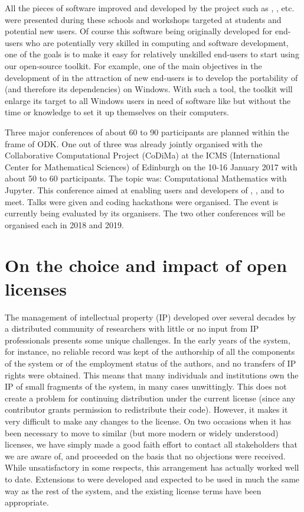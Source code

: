 \documentclass{deliverablereport}
\begin{document}
All the pieces of software improved and developed by the project such as \Sage, \Singular, etc. were presented during these schools and workshops targeted at students and potential new users. Of course this software being originally developed for end-users who are potentially very skilled in computing and software development, one of the goals is to make it easy  for relatively unskilled end-users to start using our open-source toolkit.
For example, one of the main objectives in the development of \Sage in the attraction of new end-users is to develop the portability of \Sage (and therefore its dependencies) on Windows. With such a tool, the toolkit will enlarge its target to all Windows users in need of software like \Sage but without the time or knowledge to set it up themselves on their computers.

Three major conferences of about 60 to 90 participants are planned within the frame of ODK. One out of three was already jointly organised with the Collaborative Computational Project (CoDiMa) at the ICMS (International Center for Mathematical Sciences) of Edinburgh on the 10-16 January 2017 with about 50 to 60 participants. The topic was: Computational Mathematics with Jupyter. This conference aimed at enabling users and developers of \GAP, \Singular, \Sage and \Jupyter to meet. Talks were given and coding hackathons were organised. The event is currently being evaluated by its organisers.
The two other conferences will be organised each in 2018 and 2019.


\section{On the choice and impact of open licenses}

The management of intellectual property (IP) developed over several
decades by a distributed community of researchers with
little or no input from IP professionals
presents some unique challenges. In the early years of the \GAP
system, for instance, no reliable record was kept of the authorship of
all the components of the system or of the employment status of the
authors, and no transfers of IP rights were obtained. This means that
many individuals and institutions own the IP of small
fragments of the system, in many cases unwittingly.
This does not create a problem for continuing
distribution under the current license (since any contributor
grants permission to redistribute their code).
However, it makes it very difficult to make any changes to the
license. On two occasions when it has been necessary to move to
similar (but more modern or widely understood) licenses, we have simply
made a good faith effort to contact all stakeholders that we are aware
of, and proceeded on the basis that no objections were received.
While unsatisfactory in some respects, this arrangement has actually
worked well to date.
Extensions to \GAP were developed and expected to be used
in much the same way as the rest of the system, and the existing
license terms have been appropriate.
\end{document}
